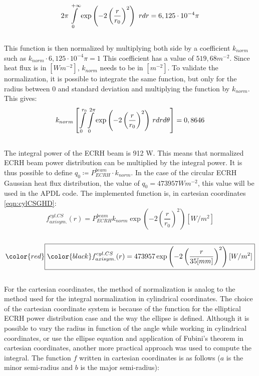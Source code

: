 \\
\begin{equation}
    2 \pi \int\displaylimits_0^{+\infty} \exp\left(-2\left(\frac{r}{r_0}\right)^2 \right) \ rdr = 6,125 \cdot 10^{-4} \pi
\end{equation}
\\
\normalsize{\indent This function is then normalized by multiplying both side by a coefficient $k_{norm}$ such as $k_{norm} \cdot 6,125 \cdot 10^{-4} \pi = 1$ This coefficient has a value of $519,68 m^{-2}$. Since heat flux is in $[Wm^{-2}]$, $k_{norm}$ needs to be in $[m^{-2}]$.  To validate the normalization, it is possible to integrate the same function, but only for the radius between 0 and standard deviation and multiplying the function by $k_{norm}$. This gives:}
\\
\begin{equation}
    k_{norm} \left[ \int\displaylimits_0^{r_0} \int\displaylimits_0^{2 \pi} \exp\left(-2\left(\frac{r}{r_0}\right)^2 \right) \,rdrd\theta \right] = 0,8646
\end{equation}
\\
\normalsize{\indent The integral power of the ECRH beam is 912 W. This means that normalized ECRH beam power distribution can be multiplied by the integral power. It is thus possible to define $q_0 \coloneqq P_{ECRH}^{beam} \cdot k_{norm}$. In the case of the circular ECRH Gaussian heat flux distribution, the value of $q_0=473957 Wm^{-2}$, this value will be used in the APDL code. The implemented function is, in cartesian coordinates \eqref{eqn:cylCSGHD}:}
\\
\begin{equation}
    f_{axisym.}^{cyl. CS}(r) = P_{ECRH}^{beam} k_{norm} \exp\left(-2\left(\frac{r}{r_0}\right)^2 \right) [W/m^2]
\end{equation}
\\ 
\begin{equation}
    \color{red}\boxed{\color{black} f_{axisym.}^{cyl. CS}(r) = 473957 \exp\left(-2\left(\frac{r}{35[mm]}\right)^2 \right) [W/m^2]}
    \label{eqn:cylCSGHD}
\end{equation}
\\
\normalsize{\indent For the cartesian coordinates, the method of normalization is analog to the method used for the integral normalization in cylindrical coordinates. The choice of the cartesian coordinate system is because of the function for the elliptical \acrshort{ECRH} power distribution case and the way the ellipse is defined. Although it is possible to vary the radius in function of the angle while working in cylindrical coordinates, or use the ellipse equation and application of Fubini’s theorem in cartesian coordinates, another more practical approach was used to compute the integral. The function $f$ written in cartesian coordinates is as follows ($a$ is the minor semi-radius and $b$ is the major semi-radius):}
